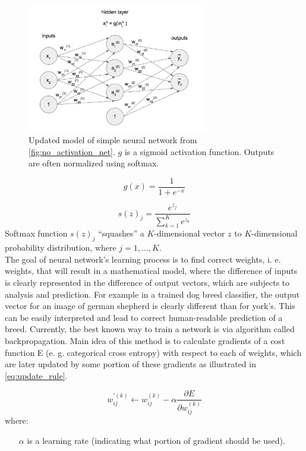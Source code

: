 \documentclass[11pt, a4paper]{article}
\begin{document}
\begin{figure}[h]
\includegraphics[width=0.7\textwidth]{activation_net}
\centering
\caption[Prosta sieć neuronowa z funkcją aktywacyjną]{Updated model of simple neural network from \autoref{fig:no_activation_net}. $g$ is a sigmoid activation function. Outputs are often normalized using softmax.}
\label{fig:activation_net}
\end{figure}

\begin{equation} \label{eq:sigmoid}
g(x) = \frac{1}{1 + e^{-x}}
\end{equation}

\begin{equation} \label{eq:softmax}
s(z)_j = \frac{e^{z_j}}{\sum_{k=1}^Ke^{z_k}}
\end{equation}
Softmax function $s(z)_j$ “squashes” a $K$-dimensional vector $z$ to $K$-dimensional probability distribution, where $j=1, ..., K$.\\

The goal of neural network's learning process is to find correct weights, i. e. weights, that will result in a mathematical model, where the difference of inputs is clearly represented in the difference of output vectors, which are subjects to analysis and prediction. For example in a trained dog breed classifier, the output vector for an image of german shepherd is clearly different than for york's. This can be easily interpreted and lead to correct human-readable prediction of a breed. Currently, the best known way to train a network is via algorithm called backpropagation. Main idea of this method is to calculate gradients of a cost function E (e. g. categorical cross entropy) with respect to each of weights, which are later updated by some portion of these gradients as illustrated in \autoref{eq:update_rule}.

\begin{equation} \label{eq:update_rule}
w_{ij}^{'(k)} \leftarrow w_{ij}^{(k)} - \alpha\frac{\partial E}{\partial w_{ij}^{(k)}}
\end{equation}
where:
\begin{itemize}
\item[$\alpha$] is a learning rate (indicating what portion of gradient should be used).
\end{itemize}
\end{document}
